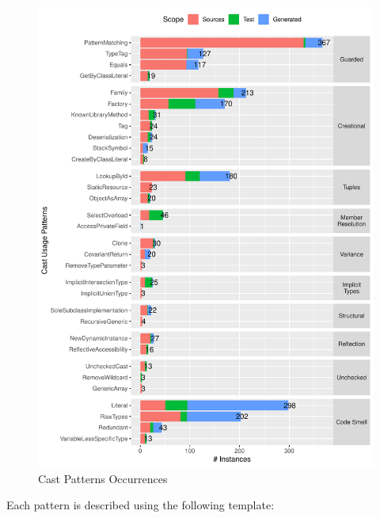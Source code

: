 

\clearpage

\begin{figure}[ht!]
\centering
\includegraphics[width=\textwidth]{analysis/table-patterns-5000.pdf}
\caption{Cast Patterns Occurrences} \label{fig:patterns}
\end{figure}

Each pattern is described using the following template:

